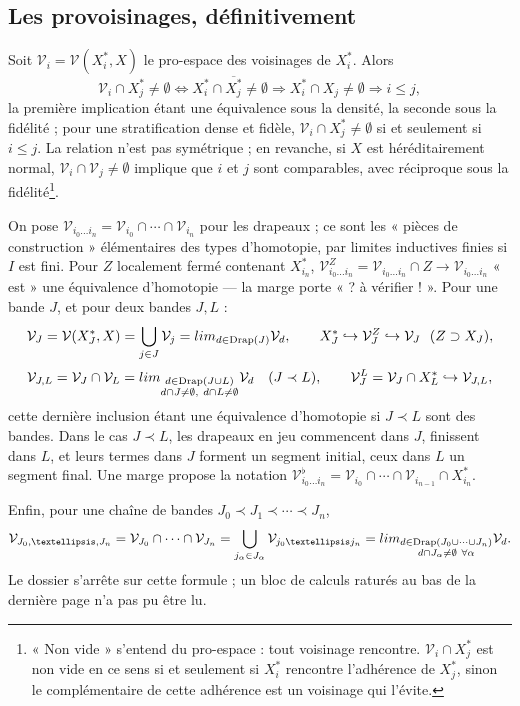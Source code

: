 \documentclass[11pt,a4paper]{article}
\begin{document}
\subsection*{Les provoisinages, définitivement}

Soit $\mathcal{V}_i = \mathcal{V}(X^{*}_i, X)$ le pro-espace des voisinages de
$X^{*}_i$. Alors
\[
\mathcal{V}_i \cap X^{*}_j \neq \emptyset \iff X^{*}_i \cap \overline{X^{*}_j} \neq
\emptyset \Longrightarrow X^{*}_i \cap X_j \neq \emptyset \Longrightarrow i \leq j ,
\]
la première implication étant une équivalence sous la densité, la seconde sous la
fidélité ; pour une stratification dense et fidèle, $\mathcal{V}_i \cap X^{*}_j \neq
\emptyset$ si et seulement si $i \leq j$. La relation n'est pas symétrique ; en
revanche, si $X$ est héréditairement normal, $\mathcal{V}_i \cap \mathcal{V}_j \neq
\emptyset$ implique que $i$ et $j$ sont comparables, avec réciproque sous la
fidélité\footnote{« Non vide » s'entend du pro-espace : tout voisinage rencontre.
$\mathcal{V}_i \cap X^{*}_j$ est non vide en ce sens si et seulement si $X^{*}_i$
rencontre l'adhérence de $X^{*}_j$, sinon le complémentaire de cette adhérence est
un voisinage qui l'évite.}.

On pose $\mathcal{V}_{i_0 … i_n} = \mathcal{V}_{i_0} \cap \cdots \cap
\mathcal{V}_{i_n}$ pour les drapeaux ; ce sont les « pièces de construction »
élémentaires des types d'homotopie, par limites inductives finies si $I$ est fini.
Pour $Z$ localement fermé contenant $X^{*}_{i_n}$, $\mathcal{V}^Z_{i_0 … i_n} =
\mathcal{V}_{i_0 … i_n} \cap Z \to \mathcal{V}_{i_0 … i_n}$ « est » une
équivalence d'homotopie — la marge porte « ? à vérifier ! ». Pour une bande $J$, et
pour deux bandes $J, L$ :
\[
\mathcal{V}_J = \mathcal{V}(X^{*}_J, X) = \bigcup_{j \in J} \mathcal{V}_j =
\varinjlim_{d \in \mathrm{Drap}(J)} \mathcal{V}_d , \qquad X^{*}_J \hookrightarrow
\mathcal{V}^Z_J \hookrightarrow \mathcal{V}_J \ \ (Z \supset X_J),
\]
\[
\mathcal{V}_{J,L} = \mathcal{V}_J \cap \mathcal{V}_L = \varinjlim_{\substack{d \in
\mathrm{Drap}(J \cup L)\\ d \cap J \neq \emptyset,\ d \cap L \neq \emptyset}}
\mathcal{V}_d \quad (J \prec L), \qquad \mathcal{V}^L_J = \mathcal{V}_J \cap X^{*}_L
\hookrightarrow \mathcal{V}_{J,L} ,
\]
cette dernière inclusion étant une équivalence d'homotopie si $J \prec L$ sont des
bandes. Dans le cas $J \prec L$, les drapeaux en jeu commencent dans $J$, finissent
dans $L$, et leurs termes dans $J$ forment un segment initial, ceux dans $L$ un
segment final. Une marge propose la notation $\mathcal{V}^{\flat}_{i_0 … i_n} =
\mathcal{V}_{i_0} \cap \cdots \cap \mathcal{V}_{i_{n-1}} \cap X^{*}_{i_n}$.

Enfin, pour une chaîne de bandes $J_0 \prec J_1 \prec \cdots \prec J_n$,
\[
\mathcal{V}_{J_0, …, J_n} = \mathcal{V}_{J_0} \cap \cdots \cap \mathcal{V}_{J_n} =
\bigcup_{j_\alpha \in J_\alpha} \mathcal{V}_{j_0 … j_n} = \varinjlim_{\substack{d
\in \mathrm{Drap}(J_0 \cup \cdots \cup J_n)\\ d \cap J_\alpha \neq \emptyset\ \forall
\alpha}} \mathcal{V}_d .
\]
Le dossier s'arrête sur cette formule ; un bloc de calculs raturés au bas de la
dernière page n'a pas pu être lu.
\end{document}
